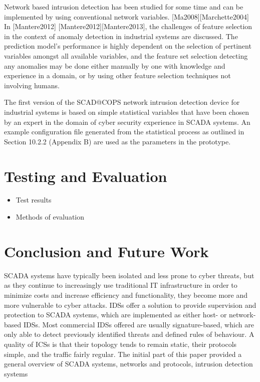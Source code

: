 \documentclass[12pt,]{article}
\begin{document}
Network based intrusion detection has been studied for some time and can
be implemented by using conventional network variables.
{[}Ma2008{]}{[}Marchette2004{]} In {[}Mantere2012{]}
{[}Mantere2012{]}{[}Mantere2013{]}, the challenges of feature selection
in the context of anomaly detection in industrial systems are discussed.
The prediction model's performance is highly dependent on the selection
of pertinent variables amongst all available variables, and the feature
set selection detecting any anomalies may be done either manually by one
with knowledge and experience in a domain, or by using other feature
selection techniques not involving humans.

The first version of the SCAD@COPS network intrusion detection device
for industrial systems is based on simple statistical variables that
have been chosen by an expert in the domain of cyber security experience
in SCADA systems. An example configuration file generated from the
statistical process as outlined in Section 10.2.2 (Appendix B) are used
as the parameters in the prototype.

\pagebreak

\section{Testing and Evaluation}\label{testing-and-evaluation}

\begin{itemize}
\itemsep1pt\parskip0pt
\item
  Test results\\
\item
  Methods of evaluation
\end{itemize}

\pagebreak

\section{Conclusion and Future Work}\label{conclusion-and-future-work}

SCADA systems have typically been isolated and less prone to cyber
threats, but as they continue to increasingly use traditional IT
infrastructure in order to minimize costs and increase efficiency and
functionality, they become more and more vulnerable to cyber attacks.
IDSs offer a solution to provide supervision and protection to SCADA
systems, which are implemented as either host- or network-based IDSs.
Most commercial IDSs offered are usually signature-based, which are only
able to detect previously identified threats and defined rules of
behaviour. A quality of ICSs is that their topology tends to remain
static, their protocols simple, and the traffic fairly regular. The
initial part of this paper provided a general overview of SCADA systems,
networks and protocols, intrusion detection systems
\end{document}
